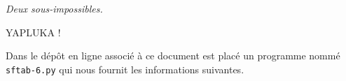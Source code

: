 \begin{center}

	\smallskip

	\emph{\small Deux sous-\sftab[x] impossibles.}
\end{center}


{\Huge YAPLUKA !}

Dans le dépôt en ligne associé à ce document est placé un programme nommé \verb#sftab-6.py# qui nous fournit les informations suivantes.

